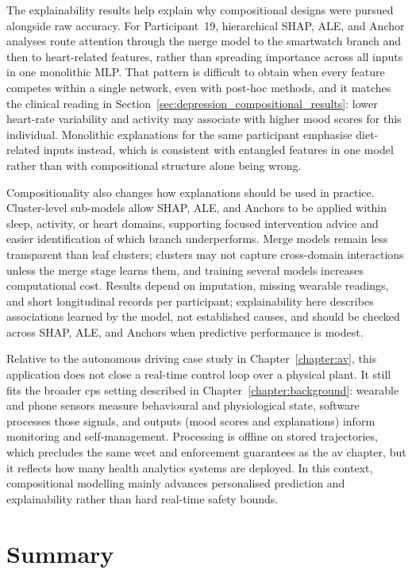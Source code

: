 The explainability results help explain why compositional designs were pursued alongside raw accuracy. For Participant~19, hierarchical SHAP, ALE, and Anchor analyses route attention through the merge model to the smartwatch branch and then to heart-related features, rather than spreading importance across all inputs in one monolithic MLP. That pattern is difficult to obtain when every feature competes within a single network, even with post-hoc methods, and it matches the clinical reading in Section~\ref{sec:depression_compositional_results}: lower heart-rate variability and activity may associate with higher mood scores for this individual. Monolithic explanations for the same participant emphasise diet-related inputs instead, which is consistent with entangled features in one model rather than with compositional structure alone being wrong.

Compositionality also changes how explanations should be used in practice. Cluster-level sub-models allow SHAP, ALE, and Anchors to be applied within sleep, activity, or heart domains, supporting focused intervention advice and easier identification of which branch underperforms. Merge models remain less transparent than leaf clusters; clusters may not capture cross-domain interactions unless the merge stage learns them, and training several models increases computational cost. Results depend on imputation, missing wearable readings, and short longitudinal records per participant; explainability here describes associations learned by the model, not established causes, and should be checked across SHAP, ALE, and Anchors when predictive performance is modest.

Relative to the autonomous driving case study in Chapter~\ref{chapter:av}, this application does not close a real-time control loop over a physical plant. It still fits the broader \gls{cps} setting described in Chapter~\ref{chapter:background}: wearable and phone sensors measure behavioural and physiological state, software processes those signals, and outputs (mood scores and explanations) inform monitoring and self-management. Processing is offline on stored trajectories, which precludes the same \gls{wcet} and enforcement guarantees as the \gls{av} chapter, but it reflects how many health analytics systems are deployed. In this context, compositional modelling mainly advances personalised prediction and explainability rather than hard real-time safety bounds.


\section{Summary}\label{sec:depression_conclusions}


